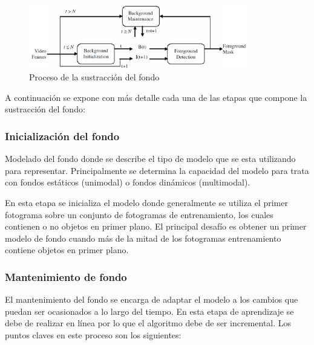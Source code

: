 \begin{figure}[ht]
\centering
\includegraphics[width=0.85\textwidth]{img/chapters/estado-del-arte/background-subtraction-process.png}
\caption{\label{fig:background-subtraction-process}Proceso de la sustracción del fondo}
\end{figure}

A continuación se expone con más detalle cada una de las etapas que compone la sustracción del fondo:

\subsubsection*{Inicialización del fondo}
\label{subsubsec:inicializacion-del-fondo}

Modelado del fondo donde se describe el tipo de modelo que se esta utilizando para representar. Principalmente se determina la capacidad del modelo para trata con fondos estáticos (unimodal) o fondos dinámicos (multimodal).

En esta etapa se inicializa el modelo donde generalmente se utiliza el primer fotograma sobre un conjunto de fotogramas de entrenamiento, los cuales contienen o no objetos en primer plano. El principal desafío es obtener un primer modelo de fondo cuando más de la mitad de los fotogramas entrenamiento contiene objetos en primer plano.


\subsubsection*{Mantenimiento de fondo}
\label{subsubsec:mantenimiento-fondo}

El mantenimiento del fondo se encarga de adaptar el modelo a los cambios que puedan ser ocasionados a lo largo del tiempo. En esta etapa de aprendizaje se debe de realizar en línea por lo que el algoritmo debe de ser incremental. Los puntos claves en este proceso son los siguientes:

